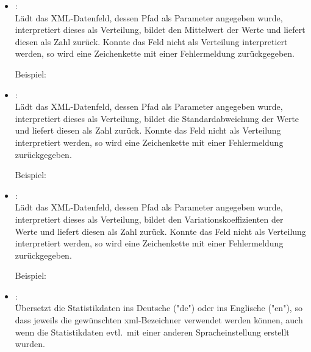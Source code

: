 \begin{itemize}
\item
{}:\\
Lädt das XML-Datenfeld, dessen Pfad als Parameter angegeben wurde, interpretiert dieses als Verteilung,
bildet den Mittelwert der Werte und liefert diesen als Zahl zurück.
Konnte das Feld nicht als Verteilung interpretiert werden, so wird eine Zeichenkette mit einer Fehlermeldung
zurückgegeben.
	
Beispiel:\\
  
\item
{}:\\
Lädt das XML-Datenfeld, dessen Pfad als Parameter angegeben wurde, interpretiert dieses als Verteilung,
bildet die Standardabweichung der Werte und liefert diesen als Zahl zurück.
Konnte das Feld nicht als Verteilung interpretiert werden, so wird eine Zeichenkette mit einer Fehlermeldung
zurückgegeben.

Beispiel:\\

\item
{}:\\
Lädt das XML-Datenfeld, dessen Pfad als Parameter angegeben wurde, interpretiert dieses als Verteilung,
bildet den Variationskoeffizienten der Werte und liefert diesen als Zahl zurück.
Konnte das Feld nicht als Verteilung interpretiert werden, so wird eine Zeichenkette mit einer Fehlermeldung
zurückgegeben.
	
Beispiel:\\

\item
{}:\\
Übersetzt die Statistikdaten ins Deutsche ("{}de") oder ins Englische ("{}en"), so dass jeweils die gewünschten
xml-Bezeichner verwendet werden können, auch wenn die Statistikdaten evtl.\ mit einer anderen Spracheinstellung
erstellt wurden.

\end{itemize}

